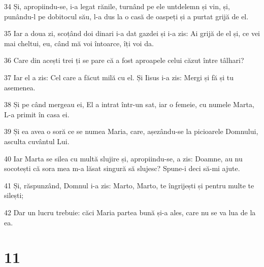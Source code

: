 \par 34 Și, apropiindu-se, i-a legat rănile, turnând pe ele untdelemn și vin, și, punându-l pe dobitocul său, l-a dus la o casă de oaspeți și a purtat grijă de el.
\par 35 Iar a doua zi, scoțând doi dinari i-a dat gazdei și i-a zis: Ai grijă de el și, ce vei mai cheltui, eu, când mă voi întoarce, îți voi da.
\par 36 Care din acești trei ți se pare că a fost aproapele celui căzut între tâlhari?
\par 37 Iar el a zis: Cel care a făcut milă cu el. Și Iisus i-a zis: Mergi și fă și tu asemenea.
\par 38 Și pe când mergeau ei, El a intrat într-un sat, iar o femeie, cu numele Marta, L-a primit în casa ei.
\par 39 Și ea avea o soră ce se numea Maria, care, așezându-se la picioarele Domnului, asculta cuvântul Lui.
\par 40 Iar Marta se silea cu multă slujire și, apropiindu-se, a zis: Doamne, au nu socotești că sora mea m-a lăsat singură să slujesc? Spune-i deci să-mi ajute.
\par 41 Și, răspunzând, Domnul i-a zis: Marto, Marto, te îngrijești și pentru multe te silești;
\par 42 Dar un lucru trebuie: căci Maria partea bună și-a ales, care nu se va lua de la ea.

\chapter{11}

